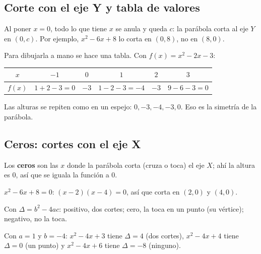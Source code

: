 \subsection{Corte con el eje Y y tabla de valores}
Al poner $x = 0$, todo lo que tiene $x$ se anula y queda $c$: la parábola corta al eje $Y$ en $(0, c)$. Por ejemplo, $x^2 - 6x + 8$ lo corta en $(0, 8)$, no en $(8, 0)$.

Para dibujarla a mano se hace una tabla. Con $f(x) = x^2 - 2x - 3$:
\begin{center}
\begin{tabular}{c|ccccc}\toprule
$x$ & $-1$ & $0$ & $1$ & $2$ & $3$\\\midrule
$f(x)$ & $1 + 2 - 3 = 0$ & $-3$ & $1 - 2 - 3 = -4$ & $-3$ & $9 - 6 - 3 = 0$\\\bottomrule
\end{tabular}
\end{center}
Las alturas se repiten como en un espejo: $0, -3, -4, -3, 0$. Eso es la simetría de la parábola.

\subsection{Ceros: cortes con el eje X}
Los \textbf{ceros} son las $x$ donde la parábola corta (cruza o toca) el eje $X$; ahí la altura es 0, así que se iguala la función a 0.
\begin{ejemplo} $x^2 - 6x + 8 = 0$: $(x - 2)(x - 4) = 0$, así que corta en $(2, 0)$ y $(4, 0)$.\end{ejemplo}
\begin{clave} Con $\Delta = b^2 - 4ac$: positivo, dos cortes; cero, la toca en un punto (su vértice); negativo, no la toca.\end{clave}
\begin{ejemplo} Con $a = 1$ y $b = -4$: $x^2 - 4x + 3$ tiene $\Delta = 4$ (dos cortes), $x^2 - 4x + 4$ tiene $\Delta = 0$ (un punto) y $x^2 - 4x + 6$ tiene $\Delta = -8$ (ninguno).\end{ejemplo}

